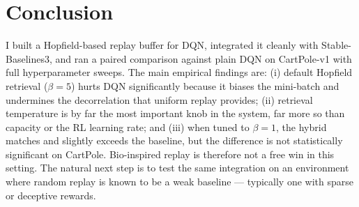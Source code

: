 \documentclass[a4paper,11pt]{article}
\begin{document}
\section{Conclusion}
\label{sec:conclusion}

I built a Hopfield-based replay buffer for DQN, integrated it cleanly
with Stable-Baselines3, and ran a paired comparison against plain DQN on
CartPole-v1 with full hyperparameter sweeps. The main empirical findings
are: (i) default Hopfield retrieval ($\beta=5$) hurts DQN significantly
because it biases the mini-batch and undermines the decorrelation that
uniform replay provides; (ii) retrieval temperature is by far the most
important knob in the system, far more so than capacity or the RL
learning rate; and (iii) when tuned to $\beta=1$, the hybrid matches and
slightly exceeds the baseline, but the difference is not statistically
significant on CartPole. Bio-inspired replay is therefore not a free win
in this setting. The natural next step is to test the same
integration on an environment where random replay is known to be a weak
baseline --- typically one with sparse or deceptive rewards.



\end{document}
